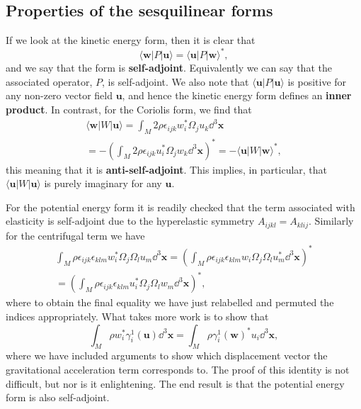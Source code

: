 \subsection*{Properties of the sesquilinear forms}

If we look at the kinetic energy form, then it is clear that
\begin{equation}
\langle \mathbf{w}|P|\mathbf{u}\rangle=\langle \mathbf{u}|P|\mathbf{w}\rangle^{*},
\label{eq:13}
\end{equation}
and we say that the form is \textbf{self-adjoint}. Equivalently we can say that the associated operator, $P$, is self-adjoint. 
We also note that $\langle \mathbf{u}|P|\mathbf{u}\rangle$ is positive for any non-zero vector field $\mathbf{u}$,
 and hence the kinetic energy form defines an \textbf{inner product}. In contrast, for the Coriolis form, we find that
\begin{multline}
\langle \mathbf{w}|W|\mathbf{u}\rangle=\int_{M}2\rho\epsilon_{ijk}w_{i}^{*}\Omega_{j}u_{k}\dd^{3}\mathbf{x} \\
 = -\left(\int_{M}2\rho\epsilon_{ijk}u_{i}^{*}\Omega_{j}w_{k}\dd^{3}\mathbf{x}\right)^{*} = -\langle \mathbf{u}|W|\mathbf{w}\rangle^{*},
\label{eq:14}
\end{multline}
this meaning that it is \textbf{anti-self-adjoint}. This implies, in particular, that $\langle \mathbf{u}|W|\mathbf{u}\rangle$ is
 purely imaginary for any $\mathbf{u}$.

For the potential energy form it is readily checked that the term associated with elasticity is self-adjoint due 
to the hyperelastic symmetry $A_{ijkl}=A_{klij}$. Similarly for the centrifugal term we have
\begin{multline}
\int_{M}\rho\epsilon_{ijk}\epsilon_{klm}w_{i}^{*}\Omega_{j}\Omega_{l}u_{m}\dd^{3}\mathbf{x}=
\left(\int_{M}\rho\epsilon_{ijk}\epsilon_{klm}w_{i}\Omega_{j}\Omega_{l}u_{m}^{*}\dd^{3}\mathbf{x}\right)^{*} \\
 = \left(\int_{M}\rho\epsilon_{ijk}\epsilon_{klm}u_{i}^{*}\Omega_{j}\Omega_{l}w_{m}\dd^{3}\mathbf{x}\right)^{*},
\label{eq:15}
\end{multline}
where to obtain the final equality we have just relabelled and permuted the indices appropriately. What takes more work is to show that
\begin{equation}
\int_{M}\rho w_{i}^{*}\gamma_{i}^{1}(\mathbf{u})\dd^{3}\mathbf{x}=\int_{M}\rho\gamma_{i}^{1}(\mathbf{w})^{*}u_{i}\dd^{3}\mathbf{x},
\label{eq:16}
\end{equation}
where we have included arguments to show which displacement vector the gravitational acceleration term corresponds to. 
The proof of this identity is not difficult, but nor is it enlightening. The end result is that the potential energy form is also self-adjoint.

